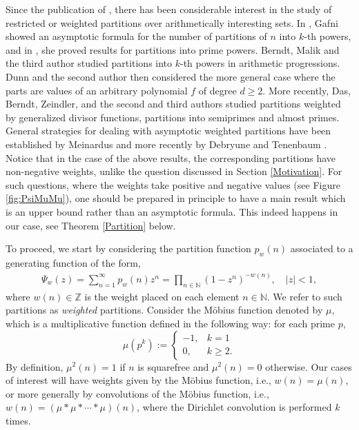 \documentclass[11pt]{amsart}
\numberwithin{equation}{section}
\numberwithin{figure}{section}
\theoremstyle{definition}
\newcommand{\N}{\mathbb{N}}
\begin{document}
Since the publication of \cite{vaughanprimes, vaughansquares}, there has been considerable interest in the study of restricted or weighted partitions over arithmetically interesting sets. In \cite{gafnipowers}, Gafni showed an asymptotic formula for the number of partitions of $n$ into $k$-th powers, and in \cite{gafniprimepowers}, she proved results for partitions into prime powers. Berndt, Malik and the third author \cite{bmz} studied partitions into $k$-th powers in arithmetic progressions. Dunn and the second author \cite{dunnrobles} then considered the more general case where the parts are values of an arbitrary polynomial $f$ of degree $d \ge 2$. More recently, Das, Berndt, Zeindler, and the second and third authors \cite{brzz, drzz, RoblesZeindler} studied partitions weighted by generalized divisor functions, partitions into semiprimes and almost primes. General strategies for dealing with asymptotic weighted partitions have been established by Meinardus  \cite{meinardus} and more recently by Debryune and Tenenbaum \cite{debruynetenenbaum}. Notice that in the case of the above results, the corresponding partitions have non-negative weights, unlike the question discussed in Section \ref{Motivation}. For such questions, where the weights take positive and negative values (see Figure \ref{fig:PsiMuMu}), one should be prepared in principle to have a main result which is an upper bound rather than an asymptotic formula. This indeed happens in our case, see Theorem \ref{Partition} below.

To proceed, we start by considering the partition function $p_{w}(n)$ associated to a generating function of the form,
\begin{align} \label{eq:introAux01}
\Psi_{w}(z) = \sum_{n=1}^\infty p_{w}(n) z^n = \prod_{n \in \N} (1-z^n)^{-w(n)}, \quad \lvert z \rvert <1,
\end{align}
where $w(n) \in \mathbb{Z}$ is the weight placed on each element $n \in \N$. We refer to such partitions as \textit{weighted} partitions. Consider the M\"{o}bius function denoted by $\mu$, which is a multiplicative function defined in the following way: for each prime $p$,
\[\mu(p^k) := \begin{cases}
  -1,  & k=1 \\
  0, & k \geqslant 2.
\end{cases}\]
By definition, $\mu^{2}(n)=1$ if $n$ is squarefree and $\mu^{2}(n)=0$ otherwise. Our cases of interest will have weights given by the M\"{o}bius function, i.e., $w(n)=\mu(n)$, or more generally by convolutions of the M\"{o}bius function, i.e., $w(n) = (\mu * \mu * \cdots * \mu)(n)$, where the Dirichlet convolution is performed $k$ times. 
\end{document}
